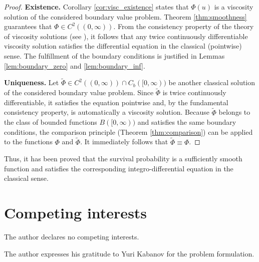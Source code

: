 \documentclass[smallextended]{svjour3}
\begin{document}
\begin{proof}
\textbf{Existence.} Corollary \ref{cor:visc_existence} states that $\Phi(u)$ is a viscosity solution of the considered boundary value problem. Theorem \ref{thm:smoothness} guarantees that $\Phi \in C^2((0, \infty))$. From the consistency property of the theory of viscosity solutions (see \cite{Crandall1992}), it follows that any twice continuously differentiable viscosity solution satisfies the differential equation in the classical (pointwise) sense. The fulfillment of the boundary conditions is justified in Lemmas \ref{lem:boundary_zero} and \ref{lem:boundary_inf}.

\textbf{Uniqueness.} Let $\tilde{\Phi} \in C^2((0, \infty)) \cap C_b([0, \infty))$ be another classical solution of the considered boundary value problem. Since $\tilde{\Phi}$ is twice continuously differentiable, it satisfies the equation pointwise and, by the fundamental consistency property, is automatically a viscosity solution. Because $\tilde{\Phi}$ belongs to the class of bounded functions $B([0, \infty))$ and satisfies the same boundary conditions, the comparison principle (Theorem \ref{thm:comparison}) can be applied to the functions $\Phi$ and $\tilde{\Phi}$. It immediately follows that $\tilde{\Phi} \equiv \Phi$.
\end{proof}

Thus, it has been proved that the survival probability is a sufficiently smooth function and satisfies the corresponding integro-differential equation in the classical sense.

\section*{Competing interests}
The author declares no competing interests.

\acknowledgement 
The author expresses his gratitude to Yuri Kabanov for the problem formulation.
\end{document}
